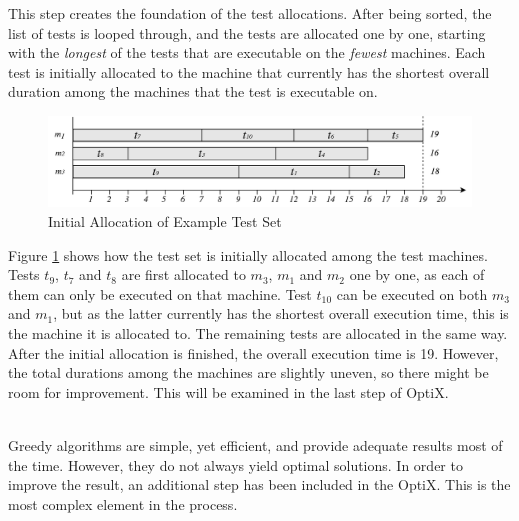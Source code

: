This step creates the foundation of the test allocations. After being sorted, the list of tests is looped through, and the tests are allocated one by one, starting with the \emph{longest} of the tests that are executable on the \emph{fewest} machines. Each test is initially allocated to the machine that currently has the shortest overall duration among the machines that the test is executable on.

\begin{figure}[h]
    \centering
    \includegraphics[width=\textwidth]{figures/new/initial_allocation3.pdf}
    \caption{Initial Allocation of Example Test Set}
    \label{fig.initial_allocation}
\end{figure}

Figure \ref{fig.initial_allocation} shows how the test set is initially allocated among the test machines. Tests $t_{9}$, $t_{7}$ and $t_{8}$ are first allocated to $m_{3}$, $m_{1}$ and $m_{2}$ one by one, as each of them can only be executed on that machine. Test $t_{10}$ can be executed on both $m_{3}$ and $m_{1}$, but as the latter currently has the shortest overall execution time, this is the machine it is allocated to. The remaining tests are allocated in the same way. After the initial allocation is finished, the overall execution time is 19. However, the total durations among the machines are slightly uneven, so there might be room for improvement. This will be examined in the last step of OptiX.






\vspace{7px}
\noindent \textbf{}\\
\noindent Greedy algorithms are simple, yet efficient, and provide adequate results most of the time. However, they do not always yield optimal solutions. In order to improve the result, an additional step has been included in the OptiX. This is the most complex element in the process.

